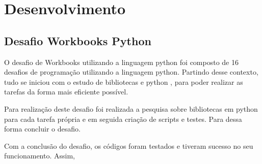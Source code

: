 \chapter{Desenvolvimento}
\label{chap:desenv}



\section{Desafio Workbooks Python}

O desafio de Workbooks utilizando a linguagem python foi composto de 16 desafios de programação utilizando a linguagem python. Partindo desse contexto, tudo se iniciou com o estudo de bibliotecas e python \cite{CursoPyt77:online}, para poder realizar as tarefas da forma mais eficiente possível.

Para realização deste desafio foi realizada a pesquisa sobre bibliotecas em python para cada tarefa própria e em seguida criação de scripts e testes. Para dessa forma concluir o desafio.

Com a conclusão do desafio, os códigos foram testados e tiveram sucesso no seu funcionamento. Assim,



